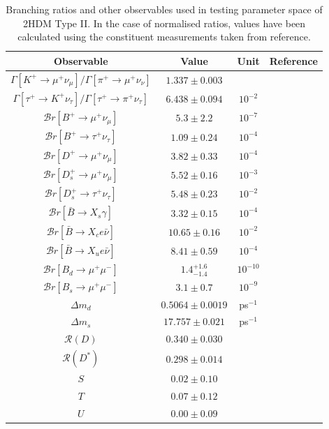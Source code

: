 \documentclass[a4paper,12pt]{article}
\begin{document}
\begin{table}[ht]
    \centering
    \begin{tabular}{c|ccc}
        \hline\hline
        Observable & Value & Unit & Reference \\
        \hline\hline
        $\Gamma[K^+\to\mu^+\nu_\mu]/\Gamma[\pi^+\to\mu^+\nu_\nu]$ & $1.337\pm0.003$ & & \cite{pdg}\\
        $\Gamma[\tau^+\to K^+\nu_\tau]/\Gamma[\tau^+\to\pi^+\nu_\tau]$ & $6.438\pm0.094$ & $10^{-2}$ & \cite{pdg} \\
        $\mathcal{B}r[B^+\to\mu^+\nu_\mu]$ & $5.3\pm2.2$ & $10^{-7}$ & \cite{bmu} \\
        $\mathcal{B}r[B^+\to\tau^+\nu_\tau]$ & $1.09\pm0.24$ & $10^{-4}$ & \cite{pdg} \\
        $\mathcal{B}r[D^+\to\mu^+\nu_\mu]$ & $3.82\pm0.33$ & $10^{-4}$ & \cite{pdg} \\
        $\mathcal{B}r[D_s^+\to\mu^+\nu_\mu]$ & $5.52\pm0.16$ & $10^{-3}$ & \cite{pdg} \\
        $\mathcal{B}r[D_s^+\to\tau^+\nu_\tau]$ & $5.48\pm0.23$ & $10^{-2}$ & \cite{pdg} \\
        $\mathcal{B}r[\bar{B}\to X_s\gamma]$ & $3.32\pm0.15$ & $10^{-4}$ & \cite{hflav,bmes} \\
        $\mathcal{B}r[\bar{B}\to X_c e\bar{\nu}]$ & $10.65\pm0.16$ & $10^{-2}$ & \cite{hflav,pdg} \\
        $\mathcal{B}r[\bar{B}\to X_ue\bar{\nu}]$ & $8.41\pm0.59$ & $10^{-4}$ & \cite{bxu} \\
        $\mathcal{B}r[B_d\to\mu^+\mu^-]$ & $1.4^{+1.6}_{-1.4}$ & $10^{-10}$ & \cite{pdg} \\
        $\mathcal{B}r[B_s\to\mu^+\mu^-]$ & $3.1\pm0.7$ & $10^{-9}$ & \cite{hflav} \\
        $\Delta m_d$ & $0.5064\pm0.0019$ & ps$^{-1}$ & \cite{hflav} \\ 
        $\Delta m_s$ & $17.757\pm0.021$ & ps$^{-1}$ & \cite{hflav} \\
        $\mathcal{R}(D)$ & $0.340\pm0.030$ & & \cite{hflav} \\
        $\mathcal{R}(D^*)$ & $0.298\pm0.014$ & & \cite{hflav} \\
        $S$ & $0.02\pm0.10$ & & \cite{pdg} \\
        $T$ & $0.07\pm0.12$ & & \cite{pdg} \\
        $U$ & $0.00\pm0.09$ & & \cite{pdg} \\
        \hline\hline
    \end{tabular}
    \caption{\label{tab:branches}Branching ratios and other observables used in testing parameter space of 2HDM Type II. In the case of normalised ratios, values have been calculated using the constituent measurements taken from reference.}
\end{table}
\end{document}
